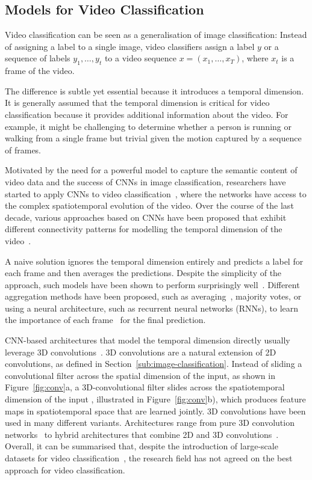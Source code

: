 \documentclass[a4paper]{article}
\begin{document}
\subsection{Models for Video Classification}
\label{sub:video-classification}

Video classification can be seen as a generalisation of image classification:
Instead of assigning a label to a single image, video classifiers assign a label
$y$ or a sequence of labels $y_1, \ldots, y_t$ to a video sequence $x = (x_1,
\ldots, x_T)$, where $x_t$ is a frame of the video.

The difference is subtle yet essential because it introduces a temporal
dimension. It is generally assumed that the temporal dimension is critical for
video classification because it provides additional information about the video.
For example, it might be challenging to determine whether a person is running or
walking from a single frame but trivial given the motion captured by a sequence
of frames.

Motivated by the need for a powerful model to capture the semantic content of
video data and the success of CNNs in image classification, researchers have
started to apply CNNs to video classification~\cite{videocnn, i3d, c3d, x3d,
slowfast}, where the networks have access to the complex spatiotemporal
evolution of the video. Over the course of the last decade, various approaches
based on CNNs have been proposed that exhibit different connectivity patterns
for modelling the temporal dimension of the video~\cite{videocnn}.

A naive solution ignores the temporal dimension entirely and predicts a label
for each frame and then averages the predictions. Despite the simplicity of the
approach, such models have been shown to perform surprisingly
well~\cite{videocnn}. Different aggregation methods have been proposed, such as
averaging~\cite{videocnn}, majority votes, or using a neural architecture, such
as recurrent neural networks (RNNs), to learn the importance of each
frame~\cite{lrcn} for the final prediction.

CNN-based architectures that model the temporal dimension directly usually
leverage 3D convolutions~\cite{c3d, i3d}. 3D convolutions are a natural
extension of 2D convolutions, as defined in
Section~\ref{sub:image-classification}. Instead of sliding a convolutional
filter across the spatial dimension of the input, as shown in
Figure~\ref{fig:conv}a, a 3D-convolutional filter slides across the
spatiotemporal dimension of the input , illustrated in Figure~\ref{fig:conv}b),
which produces feature maps in spatiotemporal space that are learned jointly. 3D
convolutions have been used in many different variants. Architectures range from
pure 3D convolution networks~\cite{i3d, c3d} to hybrid architectures that
combine 2D and 3D convolutions~\cite{x3d, slowfast}. Overall, it can be
summarised that, despite the introduction of large-scale datasets for video
classification~\cite{kinetics}, the research field has not agreed on the best
approach for video classification.
\end{document}
